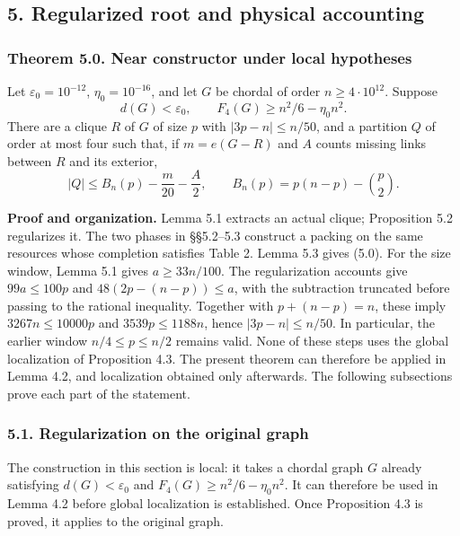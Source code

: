 \documentclass[english,11pt,a4paper]{article}
\begin{document}
\subsection{5. Regularized root and physical accounting}\label{regularized-root-and-physical-accounting}

\subsubsection{Theorem 5.0. Near constructor under local hypotheses}\label{theorem-5.0.-near-constructor-under-local-hypotheses}

Let \(\varepsilon_0=10^{-12}\), \(\eta_0=10^{-16}\), and let \(G\) be chordal of order \(n\ge4\cdot10^{12}\). Suppose \[
d(G)<\varepsilon_0,\qquad F_4(G)\ge n^2/6-\eta_0n^2.
\] There are a clique \(R\) of \(G\) of size \(p\) with \(|3p-n|\le n/50\), and a partition \(Q\) of order at most four such that, if \(m=e(G-R)\) and \(A\) counts missing links between \(R\) and its exterior, \[
|Q|\le B_n(p)-\frac m{20}-\frac A2,\qquad
B_n(p)=p(n-p)-\binom p2.
\tag{5.0}
\]

\textbf{Proof and organization.} Lemma 5.1 extracts an actual clique; Proposition 5.2 regularizes it. The two phases in §§5.2--5.3 construct a packing on the same resources whose completion satisfies Table 2. Lemma 5.3 gives (5.0). For the size window, Lemma 5.1 gives \(a\ge33n/100\). The regularization accounts give \(99a\le100p\) and \(48(2p-(n-p))\le a\), with the subtraction truncated before passing to the rational inequality. Together with \(p+(n-p)=n\), these imply \(3267n\le10000p\) and \(3539p\le1188n\), hence \(|3p-n|\le n/50\). In particular, the earlier window \(n/4\le p\le n/2\) remains valid. None of these steps uses the global localization of Proposition 4.3. The present theorem can therefore be applied in Lemma 4.2, and localization obtained only afterwards. The following subsections prove each part of the statement.

\subsubsection{5.1. Regularization on the original graph}\label{regularization-on-the-original-graph}

The construction in this section is local: it takes a chordal graph \(G\) already satisfying \(d(G)<\varepsilon_0\) and \(F_4(G)\ge n^2/6-\eta_0n^2\). It can therefore be used in Lemma 4.2 before global localization is established. Once Proposition 4.3 is proved, it applies to the original graph.
\end{document}
